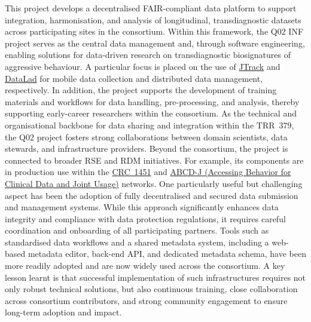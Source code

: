 \documentclass{eceasst}
\begin{document}
This project develops a decentralised FAIR-compliant data platform to support integration, harmonisation, and analysis of longitudinal, transdiagnostic datasets across participating sites in the consortium.
Within this framework, the Q02 INF project serves as the central data management and, through software engineering, enabling solutions for data-driven research on transdiagnostic biosignatures of aggressive behaviour.
A particular focus is placed on the use of
\href{https://jtrack.readthedocs.io/en/latest/index.html}{JTrack}
and
\href{https://www.datalad.org/}{DataLad}
for mobile data collection and distributed data management, respectively.
In addition, the project supports the development of training materials and workflows for data handling, pre-processing, and analysis, thereby supporting early-career researchers within the consortium.
As the technical and organisational backbone for data sharing and integration within the TRR~379, the Q02 project fosters strong collaborations between domain scientists, data stewards, and infrastructure providers.
Beyond the consortium, the project is connected to broader RSE and RDM initiatives.
For example, its components are in production use within the
\href{https://www.crc1451.uni-koeln.de/}{CRC~1451}
and
\href{https://abcd-j.de/}{ABCD-J (Accessing Behavior for Clinical Data and Joint Usage)}
networks.
One particularly useful but challenging aspect has been the adoption of fully decentralised and secured data submission and management systems.
While this approach significantly enhances data integrity and compliance with data protection regulations, it requires careful coordination and onboarding of all participating partners.
Tools such as standardised data workflows and a shared metadata system, including a web-based metadata editor, back-end API, and dedicated metadata schema, have been more readily adopted and are now widely used across the consortium.
A key lesson learnt is that successful implementation of such infrastructures requires not only robust technical solutions, but also continuous training, close collaboration across consortium contributors, and strong community engagement to ensure long-term adoption and impact.
\end{document}
